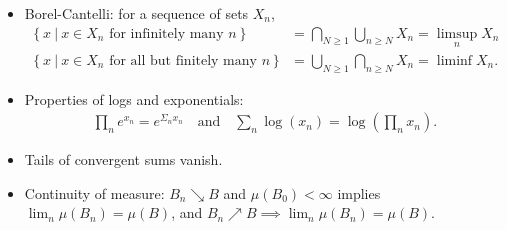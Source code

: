 \begin{concept}

\envlist

\begin{itemize}
\item
  Borel-Cantelli: for a sequence of sets \(X_n\),
  \begin{align*}
  \left\{{x {~\mathrel{\Big|}~}x\in X_n \text{ for infinitely many $n$} }\right\} 
  &= \displaystyle\bigcap_{N\geq 1} \displaystyle\bigcup_{n\geq N} X_n = \limsup_n X_n
  \\
  \left\{{x {~\mathrel{\Big|}~}x\in X_n \text{ for all but finitely many $n$} }\right\}
  &= \displaystyle\bigcup_{N\geq 1} \displaystyle\bigcap_{n\geq N} X_n = \liminf X_n
  .\end{align*}
\item
  Properties of logs and exponentials:
  \begin{align*}
  \prod_n e^{x_n} = e^{\Sigma_n x_n} \quad\text{and} \quad \sum_n \log(x_n) = \log\left(\prod_n x_n\right)
  .\end{align*}
\item
  Tails of convergent sums vanish.
\item
  Continuity of measure: \(B_n \searrow B\) and \(\mu(B_0)<\infty\)
  implies \(\lim_n \mu(B_n) = \mu(B)\), and
  \(B_n\nearrow B \implies \lim_n \mu(B_n) = \mu(B)\).
\end{itemize}

\end{concept}

